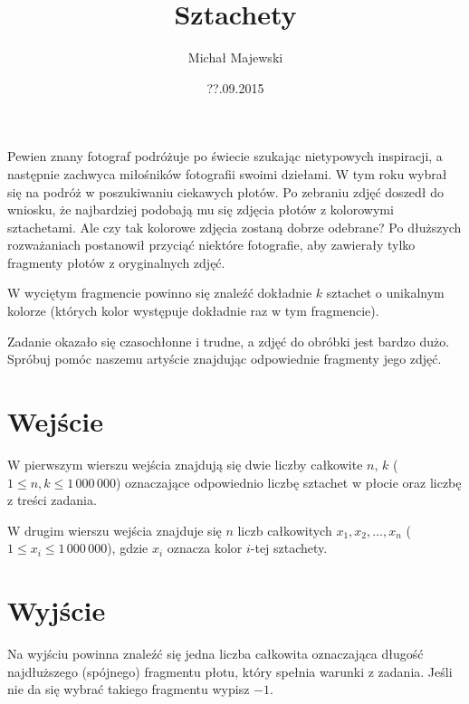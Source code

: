 \documentclass[zad,zawodnik,utf8]{sinol}
\title{Sztachety}
\author{Michał Majewski} %
\date{??.09.2015}
\begin{document}
\begin{tasktext}%
Pewien znany fotograf podróżuje po świecie szukając nietypowych inspiracji, a następnie zachwyca miłośników fotografii swoimi dziełami. W tym roku wybrał się na podróż w poszukiwaniu ciekawych płotów. Po zebraniu zdjęć doszedł do wniosku, że najbardziej podobają mu się zdjęcia płotów z kolorowymi sztachetami. Ale czy tak kolorowe zdjęcia zostaną dobrze odebrane? Po dłuższych rozważaniach postanowił przyciąć niektóre fotografie, aby zawierały tylko fragmenty płotów z oryginalnych zdjęć.

W wyciętym fragmencie powinno się znaleźć dokładnie $k$ sztachet o unikalnym kolorze (których kolor występuje dokładnie raz w tym fragmencie).

Zadanie okazało się czasochłonne i trudne, a zdjęć do obróbki jest bardzo dużo. Spróbuj pomóc naszemu artyście znajdując odpowiednie fragmenty jego zdjęć.

\section{Wejście}
W pierwszym wierszu wejścia znajdują się dwie liczby całkowite $n$, $k$ ($1 \leq n, k \leq 1\,000\,000$) oznaczające odpowiednio liczbę sztachet w płocie oraz liczbę z treści zadania.

W drugim wierszu wejścia znajduje się $n$ liczb całkowitych $x_1, x_2, \ldots, x_n$ ($1 \leq x_i \leq 1\,000\,000$), gdzie $x_i$ oznacza kolor $i$-tej sztachety.

\section{Wyjście}
Na wyjściu powinna znaleźć się jedna liczba całkowita oznaczająca długość najdłuższego (spójnego) fragmentu płotu, który spełnia warunki z zadania. Jeśli nie da się wybrać takiego fragmentu wypisz $-1$.

\makecompactexample

\end{tasktext}
\end{document}

